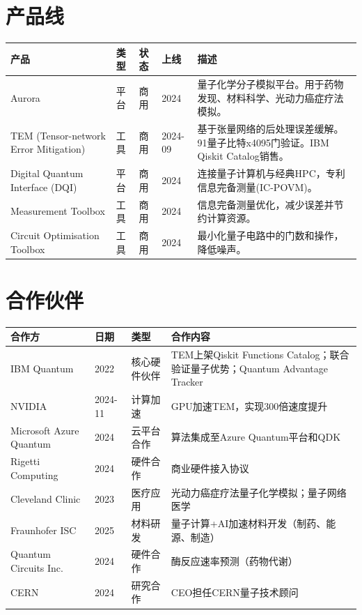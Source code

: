 \documentclass[11pt,a4paper]{ctexart}
\begin{document}
\section{产品线}
{\footnotesize\begin{longtable}{p{2.5cm}p{1.2cm}p{1cm}p{1.5cm}p{7.5cm}}
\toprule\textbf{产品} & \textbf{类型} & \textbf{状态} & \textbf{上线} & \textbf{描述} \\ \midrule\endfirsthead
Aurora & 平台 & 商用 & 2024 & 量子化学分子模拟平台。用于药物发现、材料科学、光动力癌症疗法模拟。 \\
TEM (Tensor-network Error Mitigation) & 工具 & 商用 & 2024-09 & 基于张量网络的后处理误差缓解。91量子比特x4095门验证。IBM Qiskit Catalog销售。 \\
Digital Quantum Interface (DQI) & 平台 & 商用 & 2024 & 连接量子计算机与经典HPC，专利信息完备测量(IC-POVM)。 \\
Measurement Toolbox & 工具 & 商用 & 2024 & 信息完备测量优化，减少误差并节约计算资源。 \\
Circuit Optimisation Toolbox & 工具 & 商用 & 2024 & 最小化量子电路中的门数和操作，降低噪声。 \\
\bottomrule\end{longtable}}
\section{合作伙伴}
{\footnotesize\begin{longtable}{p{2.8cm}p{1.5cm}p{2cm}p{7.2cm}}
\toprule\textbf{合作方} & \textbf{日期} & \textbf{类型} & \textbf{合作内容} \\ \midrule\endfirsthead
IBM Quantum & 2022 & 核心硬件伙伴 & TEM上架Qiskit Functions Catalog；联合验证量子优势；Quantum Advantage Tracker \\
NVIDIA & 2024-11 & 计算加速 & GPU加速TEM，实现300倍速度提升 \\
Microsoft Azure Quantum & 2024 & 云平台合作 & 算法集成至Azure Quantum平台和QDK \\
Rigetti Computing & 2024 & 硬件合作 & 商业硬件接入协议 \\
Cleveland Clinic & 2023 & 医疗应用 & 光动力癌症疗法量子化学模拟；量子网络医学 \\
Fraunhofer ISC & 2025 & 材料研发 & 量子计算+AI加速材料开发（制药、能源、制造） \\
Quantum Circuits Inc. & 2024 & 硬件合作 & 酶反应速率预测（药物代谢） \\
CERN & 2024 & 研究合作 & CEO担任CERN量子技术顾问 \\
\bottomrule\end{longtable}}
\end{document}
